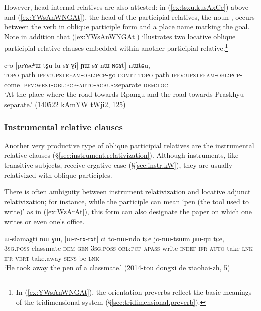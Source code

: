 However, head-internal relatives are also attested: in (\ref{ex:tsxu.kusAxCe}) above and (\ref{ex:YWsAnWNGAt}), the head of the participial relatives, the noun , occurs between the verb in oblique participle form and a place name marking the goal. Note in addition that (\ref{ex:YWsAnWNGAt}) illustrates two locative oblique participial relative clauses embedded within another participial relative.\footnote{In (\ref{ex:YWsAnWNGAt}), the orientation preverbs reflect the basic meanings of the tridimensional system (§\ref{sec:tridimensional.preverb}). 
}

\begin{exe}
\ex \label{ex:YWsAnWNGAt}
\gll   [[rpɤŋgɯ tʂu lu-sɤx-ɕe] cʰo [prɤscʰɯ tʂu lu-sɤ-ɣi] ɲɯ-sɤ-nɯ-ɴɢɤt] nɯtɕu, \\
\textsc{topo}  path \textsc{ipfv}:\textsc{upstream}-\textsc{obl}:\textsc{pcp}-go \textsc{comit}  \textsc{topo}  path \textsc{ipfv}:\textsc{upstream}-\textsc{obl}:\textsc{pcp}-come \textsc{ipfv}:\textsc{west}-\textsc{obl}:\textsc{pcp}-\textsc{auto}-\textsc{acaus}:separate \textsc{dem}:\textsc{loc} \\
\glt `At the place where the road towards Rpangu and the road towards Praskhyu separate.' (140522 kAmYW tWji2, 125)
\end{exe}

\subsubsection{Instrumental relative clauses} \label{sec:instrumental.participle.relatives}
Another very productive type of oblique participial relatives are the instrumental relative clauses (§\ref{sec:instrument.relativization}). Although instruments, like transitive subjects, receive ergative case (§\ref{sec:instr.kW}), they are usually relativized with oblique participles.

There is often ambiguity between instrument relativization and locative adjunct relativization; for instance, while the participle  can mean `pen (the tool used to write)' as in (\ref{ex:WzArAt}), this form can also designate the paper on which one writes or even one's office.

\begin{exe}
\ex \label{ex:WzArAt}
\gll ɯ-slamaχti nɯ ɣɯ, [ɯ-z-rɤ-rɤt] ci to-nɯ-ndo tɕe jo-nɯ-tsɯm ɲɯ-ŋu tɕe, \\
\textsc{3sg}.\textsc{poss}-classmate \textsc{dem} \textsc{gen} \textsc{3sg}.\textsc{poss}-\textsc{obl}:\textsc{pcp}-\textsc{apass}-write \textsc{indef} \textsc{ifr}-\textsc{auto}-take \textsc{lnk} \textsc{ifr}-\textsc{vert}-take.away \textsc{sens}-be \textsc{lnk} \\
\glt `He took away the pen of a classmate.' (2014-tou dongxi de xiaohai-zh, 5)
\end{exe}

